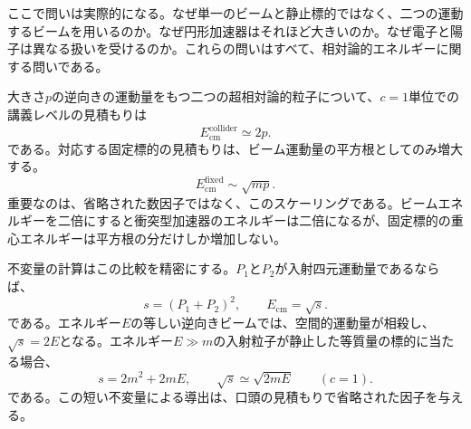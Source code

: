 ここで問いは実際的になる。なぜ単一のビームと静止標的ではなく、二つの運動するビームを用いるのか。なぜ円形加速器はそれほど大きいのか。なぜ電子と陽子は異なる扱いを受けるのか。これらの問いはすべて、相対論的エネルギーに関する問いである。

\begin{classroomqa}
\end{classroomqa}

大きさ\(p\)の逆向きの運動量をもつ二つの超相対論的粒子について、\(c=1\)単位での講義レベルの見積もりは
\begin{equation}
E_{\mathrm{cm}}^{\mathrm{collider}}\simeq 2p.
\end{equation}
である。対応する固定標的の見積もりは、ビーム運動量の平方根としてのみ増大する。
\begin{equation}
E_{\mathrm{cm}}^{\mathrm{fixed}}\sim \sqrt{mp}.
\end{equation}
重要なのは、省略された数因子ではなく、このスケーリングである。ビームエネルギーを二倍にすると衝突型加速器のエネルギーは二倍になるが、固定標的の重心エネルギーは平方根の分だけしか増加しない。

不変量の計算はこの比較を精密にする。\(P_1\)と\(P_2\)が入射四元運動量であるならば、
\begin{equation}
s=(P_1+P_2)^2,
\qquad E_{\mathrm{cm}}=\sqrt{s}.
\end{equation}
である。エネルギー\(E\)の等しい逆向きビームでは、空間的運動量が相殺し、\(\sqrt{s}=2E\)となる。エネルギー\(E\gg m\)の入射粒子が静止した等質量の標的に当たる場合、
\begin{equation}
s=2m^2+2mE,
\qquad
\sqrt{s}\simeq \sqrt{2mE}
\qquad (c=1).
\end{equation}
である。この短い不変量による導出は、口頭の見積もりで省略された因子を与える。

\begin{classroomqa}
\end{classroomqa}

